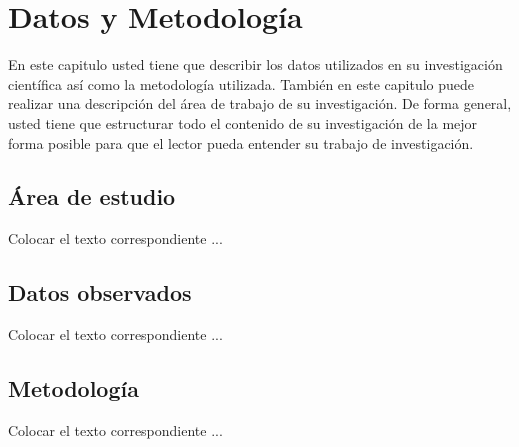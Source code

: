 \chapter{Datos y Metodología}
\label{cap2}

En este capitulo usted tiene que describir los datos utilizados en su investigación científica así como la metodología utilizada. También en este capitulo puede realizar una descripción del área de trabajo de su investigación. De forma general, usted tiene que estructurar todo el contenido de su investigación de la mejor forma posible para que el lector pueda entender su trabajo de investigación.


\section{Área de estudio}
Colocar el texto correspondiente ...

\section{Datos observados}
Colocar el texto correspondiente ...

\section{Metodología}

Colocar el texto correspondiente ...

